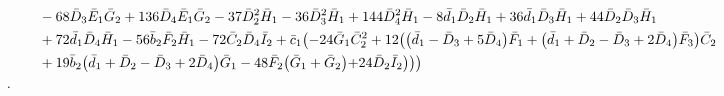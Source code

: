 \documentclass[10pt]{amsart}
\theoremstyle{definition}
\theoremstyle{corollary}
\theoremstyle{remark}
\theoremstyle{conclusion}
\begin{document}
\begin{align}
& \hskip 0.7cm-68 \bar{D}_3 \bar{E}_1 \bar{G}_2+136 \bar{D}_4 \bar{E}_1 \bar{G}_2-37 \bar{D}_2^2 \bar{H}_1-36 \bar{D}_3^2 \bar{H}_1+144 \bar{D}_4^2 \bar{H}_1-8 \bar{d}_1 \bar{D}_2 \bar{H}_1+36 \bar{d}_1 \bar{D}_3 \bar{H}_1+44 \bar{D}_2 \bar{D}_3 \bar{H}_1\nonumber \\
& \hskip 0.7cm+72 \bar{d}_1 \bar{D}_4 \bar{H}_1-56 \bar{b}_2 \bar{F}_2 \bar{H}_1-72 \bar{C}_2 \bar{D}_4 \bar{I}_2+\bar{c}_1 \bigl(-24 \bar{G}_1 \bar{C}_2^2+12 \bigl(\bigl(\bar{d}_1-\bar{D}_3+5 \bar{D}_4\bigl) \bar{F}_1+\bigl(\bar{d}_1+\bar{D}_2-\bar{D}_3+2 \bar{D}_4\bigl) \bar{F}_3\bigl) \bar{C}_2\nonumber \\
& \hskip 0.7cm+19 \bar{b}_2 \bigl(\bar{d}_1+\bar{D}_2-\bar{D}_3+2 \bar{D}_4\bigl) \bar{G}_1-48 \bar{F}_2 \bigl(\bar{G}_1+\bar{G}_2\bigl)+24 \bar{D}_2 \bar{I}_2\bigl)\bigl)\bigl) \, \nonumber\\.
\end{align}
\end{document}
